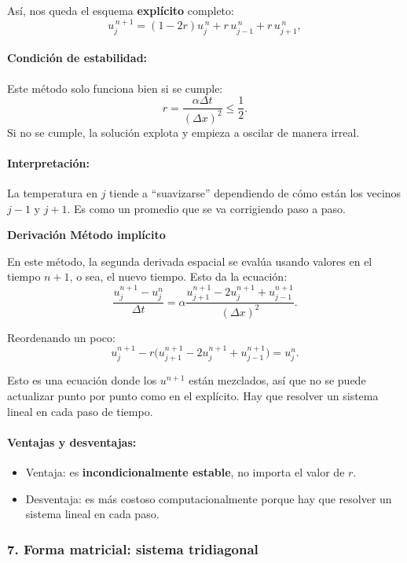 \documentclass[12pt,a4paper]{article}
\begin{document}
Así, nos queda el esquema \textbf{explícito} completo:
\[
\boxed{u_j^{\,n+1} = (1 - 2r)u_j^{\,n} + r\,u_{j-1}^{\,n} + r\,u_{j+1}^{\,n}},
\]


\paragraph{Condición de estabilidad:}  
Este método solo funciona bien si se cumple:
\[
r = \frac{\alpha \Delta t}{(\Delta x)^2} \leq \frac{1}{2}.
\]
Si no se cumple, la solución explota y empieza a oscilar de manera irreal.

\paragraph{Interpretación:}  
La temperatura en $j$ tiende a ``suavizarse'' dependiendo de cómo están los vecinos $j-1$ y $j+1$. Es como un promedio que se va corrigiendo paso a paso.

\textbf{Derivación Método implícito}

En este método, la segunda derivada espacial se evalúa usando valores en el tiempo $n+1$, o sea, el nuevo tiempo. Esto da la ecuación:
\[
\frac{u_j^{n+1}-u_j^n}{\Delta t} = \alpha \frac{u_{j+1}^{n+1} - 2u_j^{n+1} + u_{j-1}^{n+1}}{(\Delta x)^2}.
\]

Reordenando un poco:
\[
u_j^{n+1} - r\big(u_{j+1}^{n+1} - 2u_j^{n+1} + u_{j-1}^{n+1}\big) = u_j^n.
\]

Esto es una ecuación donde los $u^{n+1}$ están mezclados, así que no se puede actualizar punto por punto como en el explícito. Hay que resolver un sistema lineal en cada paso de tiempo.

\paragraph{Ventajas y desventajas:}
\begin{itemize}
    \item Ventaja: es \textbf{incondicionalmente estable}, no importa el valor de $r$.
    \item Desventaja: es más costoso computacionalmente porque hay que resolver un sistema lineal en cada paso.
\end{itemize}

\subsubsection{7. Forma matricial: sistema tridiagonal}
\end{document}
